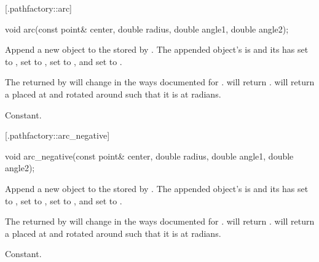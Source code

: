  [\iotwod.pathfactory::arc] {}

%
%
\begin{itemdecl}
void arc(const point& center, double radius, double angle1, double angle2);
\end{itemdecl}
\begin{itemdescr}
	\pnum
	\effects
	Append a new  object to the  stored by 
	. The appended object's  is 
	 and its  has 
	 set to , 
	 set to , 
	 set to , and
	 set to .
	
	\pnum
	\postconditions
	The  returned by  will change 
	in the ways documented for .
	 will return .
	 will return a  placed at 
	 and rotated around  
	such that it is at  radians.
	
	\pnum
	\complexity
	Constant.
\end{itemdescr}

 [\iotwod.pathfactory::arc_negative] {}

%
%
\begin{itemdecl}
void arc_negative(const point& center, double radius, double angle1, double 
angle2);
\end{itemdecl}
\begin{itemdescr}
	\pnum
	\effects
	Append a new  object to the  stored by 
	. The appended object's  is 
	 and its  has 
	 set to , 
	 set to , 
	 set to , and
	 set to .
	
	\pnum
	\postconditions
	The  returned by  will change 
	in the ways documented for .
	 will return . 
	 will return a  placed at 
	 and rotated around  
	such that it is at  radians.
	
	\pnum
	\complexity
	Constant.
\end{itemdescr}

